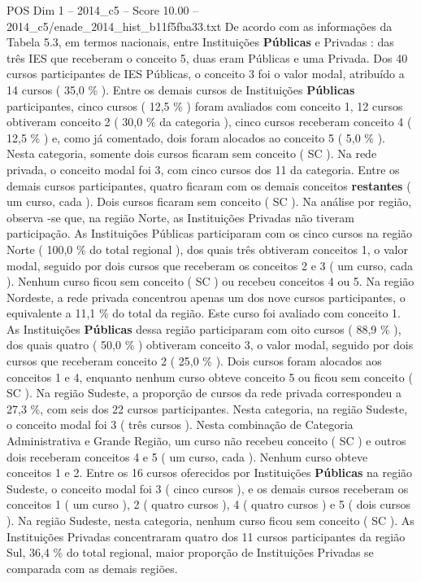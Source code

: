 \begin{textsample}{POS Dim 1 – 2014\_c5 – Score 10.00 – 2014\_c5/enade\_2014\_hist\_b11f5fba33.txt}
De acordo com as informações da Tabela 5.3, em termos nacionais, entre Instituições \textbf{Públicas} e Privadas : das três IES que receberam o conceito 5, duas eram Públicas e uma Privada.
Dos 40 cursos participantes de IES Públicas, o conceito 3 foi o valor modal, atribuído a 14 cursos ( 35,0 \% ).
Entre os demais cursos de Instituições \textbf{Públicas} participantes, cinco cursos ( 12,5 \% ) foram avaliados com conceito 1, 12 cursos obtiveram conceito 2 ( 30,0 \% da categoria ), cinco cursos receberam conceito 4 ( 12,5 \% ) e, como já comentado, dois foram alocados ao conceito 5 ( 5,0 \% ).
Nesta categoria, somente dois cursos ficaram sem conceito ( SC ).
Na rede privada, o conceito modal foi 3, com cinco cursos dos 11 da categoria.
Entre os demais cursos participantes, quatro ficaram com os demais conceitos \textbf{restantes} ( um curso, cada ).
Dois cursos ficaram sem conceito ( SC ).
Na análise por região, observa -se que, na região Norte, as Instituições Privadas não tiveram participação.
As Instituições Públicas participaram com os cinco cursos na região Norte ( 100,0 \% do total regional ), dos quais três obtiveram conceitos 1, o valor modal, seguido por dois cursos que receberam os conceitos 2 e 3 ( um curso, cada ).
Nenhum curso ficou sem conceito ( SC ) ou recebeu conceitos 4 ou 5.
Na região Nordeste, a rede privada concentrou apenas um dos nove cursos participantes, o equivalente a 11,1 \% do total da região.
Este curso foi avaliado com conceito 1.
As Instituições \textbf{Públicas} dessa região participaram com oito cursos ( 88,9 \% ), dos quais quatro ( 50,0 \% ) obtiveram conceito 3, o valor modal, seguido por dois cursos que receberam conceito 2 ( 25,0 \% ).
Dois cursos foram alocados aos conceitos 1 e 4, enquanto nenhum curso obteve conceito 5 ou ficou sem conceito ( SC ).
Na região Sudeste, a proporção de cursos da rede privada correspondeu a 27,3 \%, com seis dos 22 cursos participantes.
Nesta categoria, na região Sudeste, o conceito modal foi 3 ( três cursos ).
Nesta combinação de Categoria Administrativa e Grande Região, um curso não recebeu conceito ( SC ) e outros dois receberam conceitos 4 e 5 ( um curso, cada ).
Nenhum curso obteve conceitos 1 e 2.
Entre os 16 cursos oferecidos por Instituições \textbf{Públicas} na região Sudeste, o conceito modal foi 3 ( cinco cursos ), e os demais cursos receberam os conceitos 1 ( um curso ), 2 ( quatro cursos ), 4 ( quatro cursos ) e 5 ( dois cursos ).
Na região Sudeste, nesta categoria, nenhum curso ficou sem conceito ( SC ).
As Instituições Privadas concentraram quatro dos 11 cursos participantes da região Sul, 36,4 \% do total regional, maior proporção de Instituições Privadas se comparada com as demais regiões.

\end{textsample}
